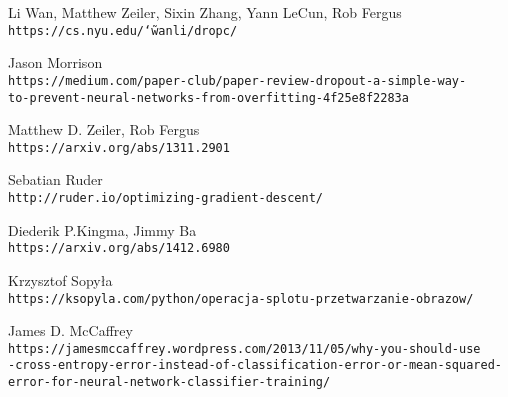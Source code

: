 \begin{thebibliography}{99}
Li Wan, Matthew Zeiler, Sixin Zhang, Yann LeCun, Rob Fergus
\\\texttt{https://cs.nyu.edu/\char`\~wanli/dropc/}

Jason Morrison
\\\texttt{https://medium.com/paper-club/paper-review-dropout-a-simple-way-\\to-prevent-neural-networks-from-overfitting-4f25e8f2283a}

Matthew D. Zeiler, Rob Fergus
\\\texttt{https://arxiv.org/abs/1311.2901}

Sebatian Ruder
\\\texttt{http://ruder.io/optimizing-gradient-descent/}

Diederik P.Kingma, Jimmy Ba
\\\texttt{https://arxiv.org/abs/1412.6980}

Krzysztof Sopyła
\\\texttt{https://ksopyla.com/python/operacja-splotu-przetwarzanie-obrazow/}

James D. McCaffrey
\\\texttt{https://jamesmccaffrey.wordpress.com/2013/11/05/why-you-should-use\\-cross-entropy-error-instead-of-classification-error-or-mean-squared-\\error-for-neural-network-classifier-training/}

\end{thebibliography}
